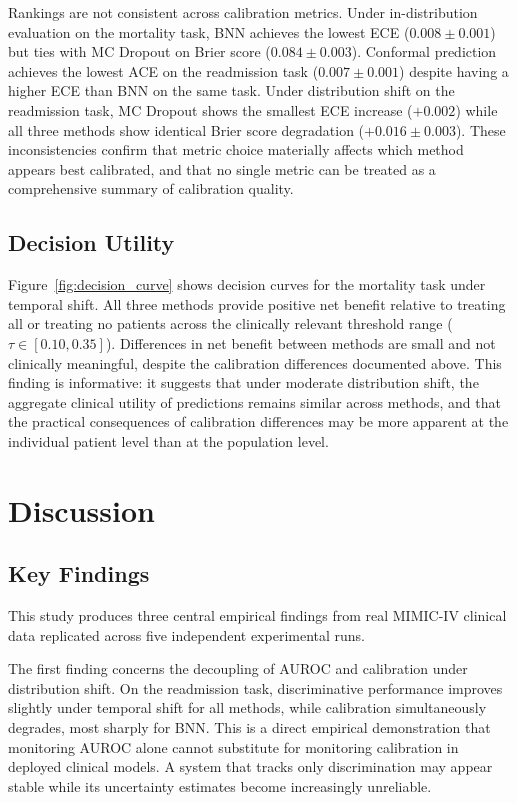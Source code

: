 \documentclass[11pt,a4paper]{article}
\begin{document}
Rankings are not consistent across calibration metrics. Under in-distribution evaluation on the mortality task, BNN achieves the lowest ECE ($0.008 \pm 0.001$) but ties with MC Dropout on Brier score ($0.084 \pm 0.003$). Conformal prediction achieves the lowest ACE on the readmission task ($0.007 \pm 0.001$) despite having a higher ECE than BNN on the same task. Under distribution shift on the readmission task, MC Dropout shows the smallest ECE increase ($+0.002$) while all three methods show identical Brier score degradation ($+0.016 \pm 0.003$). These inconsistencies confirm that metric choice materially affects which method appears best calibrated, and that no single metric can be treated as a comprehensive summary of calibration quality.

\subsection{Decision Utility}

Figure~\ref{fig:decision_curve} shows decision curves for the mortality task under temporal shift. All three methods provide positive net benefit relative to treating all or treating no patients across the clinically relevant threshold range ($\tau \in [0.10, 0.35]$). Differences in net benefit between methods are small and not clinically meaningful, despite the calibration differences documented above. This finding is informative: it suggests that under moderate distribution shift, the aggregate clinical utility of predictions remains similar across methods, and that the practical consequences of calibration differences may be more apparent at the individual patient level than at the population level.

\section{Discussion}
\label{sec:discussion}

\subsection{Key Findings}

This study produces three central empirical findings from real MIMIC-IV clinical data replicated across five independent experimental runs.

The first finding concerns the decoupling of AUROC and calibration under distribution shift. On the readmission task, discriminative performance improves slightly under temporal shift for all methods, while calibration simultaneously degrades, most sharply for BNN. This is a direct empirical demonstration that monitoring AUROC alone cannot substitute for monitoring calibration in deployed clinical models. A system that tracks only discrimination may appear stable while its uncertainty estimates become increasingly unreliable.
\end{document}

